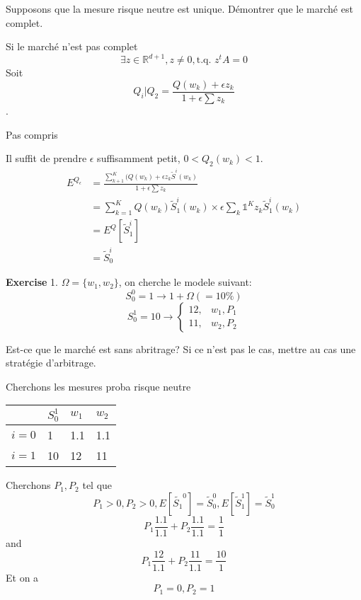 \documentclass{article}
\theoremstyle{plain}
\theoremstyle{definition}
\begin{document}
Supposons que la mesure risque neutre est unique. D\'emontrer que le march\'e est complet.

Si le march\'e n'est pas complet 
\begin{equation}
	\exists z\in\mathbb{R}^{d+1}, z\neq 0, \text{t.q. } z^tA=0
\end{equation}
Soit
\begin{equation}
	Q_i|Q_2=\frac{Q(w_k)+\epsilon z_k}{1+\epsilon \sum z_k}
\end{equation}. 

{\color{red} Pas compris}

Il suffit de prendre $\epsilon$ suffisamment petit, $0<Q_2(w_k)<1$.
\begin{equation}
	\begin{split}
		E^{Q_\epsilon}&=\frac{\sum_{k+1}^K (Q(w_k)+\epsilon z_k \tilde{S}^i(w_k)}{1+\epsilon \sum z_k}\\
		&=\sum_{k=1}^K Q(w_k) \tilde{S}_1^i(w_k)\times\epsilon \sum_k \mathds{1}^{K} z_k \tilde{S}_1^i (w_k)\\
		&=E^Q[\tilde{S}_1^i]\\ 
		&=\tilde{S}_0^i
	\end{split}
\end{equation}

\textbf{Exercise}
1. $\Omega=\{w_1, w_2\}$, on cherche le modele suivant:
\begin{equation}
	S_0^0=1 \rightarrow 1+\Omega(=10\%)
\end{equation}
\begin{equation}
	S_0^1=10\rightarrow\left\{
	\begin{array}{rc}
		12, &w_1,P_1\\
		11, &w_2,P_2
	\end{array}\right.
\end{equation}

Est-ce que le march\'e est sans abritrage? Si ce n'est pas le cas, mettre au cas une strat\'egie d'arbitrage.

Cherchons les mesures proba risque neutre
\begin{center}
\begin{tabular}{l|lll}
   & $S_0^1$ & $w_1$ & $w_2$ \\ \hline 
 $i=0$ & 1 & 1.1 & 1.1 \\
 $i=1$ & 10 & 12 & 11 \\
\end{tabular}	
\end{center}

Cherchons $P_1, P_2$ tel que 
\begin{equation}
P_1>0, P_2>0, E[\tilde{S_1}^0] = \tilde{S}_0^0, E[\tilde{S}_1^1]=\tilde{S}_0^1
\end{equation}
\begin{equation}
	P_1\frac{1.1}{1.1}+P_2\frac{1.1}{1.1}=\frac{1}{1} 
\end{equation}
and
\begin{equation}
	P_1\frac{12}{1.1}+P_2\frac{11}{1.1}=\frac{10}{1}
\end{equation}
Et on a
\begin{equation}
P_1=0, P_2=1
\end{equation}
 
\end{document}
